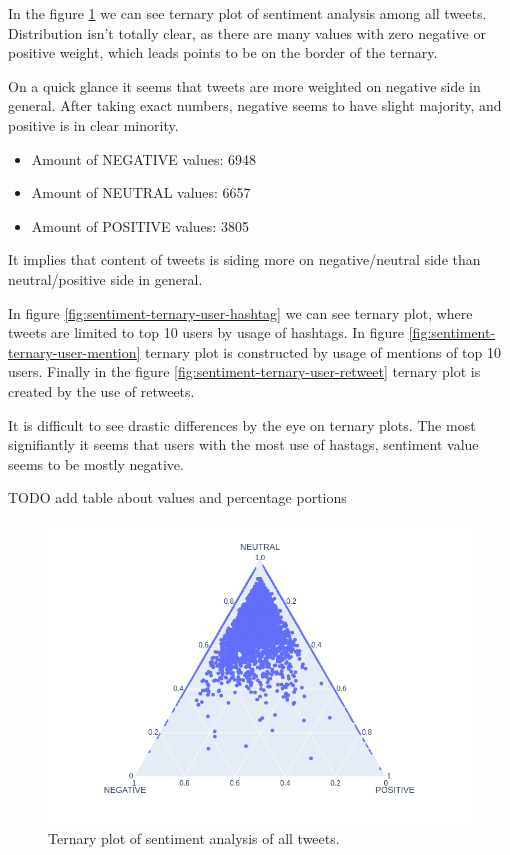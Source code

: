 \documentclass[conference]{IEEEtran}
\begin{document}
In the figure \ref{fig:sentiment-ternary-all} we can see ternary plot of sentiment analysis among all tweets.
Distribution isn't totally clear, as there are many values with zero negative or positive weight, which leads points to be on the border of the ternary.

On a quick glance it seems that tweets are more weighted on negative side in general.
After taking exact numbers, negative seems to have slight majority, and positive is in clear minority.

\begin{itemize}
    \item Amount of NEGATIVE values: 6948
    \item Amount of NEUTRAL values: 6657
    \item Amount of POSITIVE values: 3805
\end{itemize}

It implies that content of tweets is siding more on negative/neutral side than neutral/positive side in general.

In figure \ref{fig:sentiment-ternary-user-hashtag} we can see ternary plot, where tweets are limited to top 10 users by usage of hashtags.
In figure \ref{fig:sentiment-ternary-user-mention} ternary plot is constructed by usage of mentions of top 10 users.
Finally in the figure \ref{fig:sentiment-ternary-user-retweet} ternary plot is created by the use of retweets.

It is difficult to see drastic differences by the eye on ternary plots. The most signifiantly it seems that users with the most use
of hastags, sentiment value seems to be mostly negative.

TODO add table about values and percentage portions

\begin{figure}
\includegraphics[scale=0.4]{figures/sentiment_ternary_all}
\caption{Ternary plot of sentiment analysis of all tweets.}
\label{fig:sentiment-ternary-all}
\end{figure}
\end{document}
